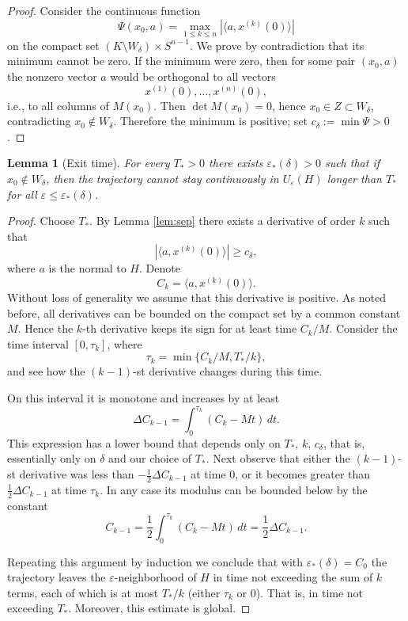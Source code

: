 \documentclass[11pt]{article}
\newcommand{\eps}{\varepsilon}
\newcommand{\dd}{\,d}
\theoremstyle{thmstyleone}
\newtheorem{lemma}[theorem]{Lemma}
\theoremstyle{thmstyletwo}
\theoremstyle{thmstylethree}
\begin{document}
\begin{appendices}
\begin{proof}
Consider the continuous function
\[
    \Psi(x_0,a)=\max_{1\le k\le n}|\langle a,x^{(k)}(0)\rangle|
\]
on the compact set $(K\setminus W_\delta)\times S^{n-1}$. We prove by contradiction that its minimum cannot be zero. If the minimum were zero, then for some pair $(x_0,a)$ the nonzero vector $a$ would be orthogonal to all vectors
\[
    x^{(1)}(0),\dots,x^{(n)}(0),
\]
i.e., to all columns of $M(x_0)$. Then $\det M(x_0)=0$, hence $x_0\in Z\subset W_\delta$, contradicting $x_0\notin W_\delta$. Therefore the minimum is positive; set $c_\delta:=\min\Psi>0$.
\end{proof}

\begin{lemma}[Exit time]
\label{lem:exit}\label{lem:exit_time_2}
For every $T_*>0$ there exists $\eps_*(\delta)>0$ such that if $x_0\notin W_\delta$, then the trajectory cannot stay continuously in $U_\eps(H)$ longer than $T_*$ for all $\eps\le\eps_*(\delta)$.
\end{lemma}

\begin{proof}
Choose $T_*$. By Lemma \ref{lem:sep} there exists a derivative of order $k$ such that
\[
    |\langle a,x^{(k)}(0)\rangle|\ge c_\delta,
\]
where $a$ is the normal to $H$. Denote
\[
    C_k=\langle a,x^{(k)}(0)\rangle.
\]
Without loss of generality we assume that this derivative is positive. As noted before, all derivatives can be bounded on the compact set by a common constant $M$. Hence the $k$-th derivative keeps its sign for at least time $C_k/M$. Consider the time interval $[0,\tau_k]$, where
\[
    \tau_k=\min\{C_k/M,T_*/k\},
\]
and see how the $(k-1)$-st derivative changes during this time.

On this interval it is monotone and increases by at least
\[
    \Delta C_{k-1}=\int_0^{\tau_k}(C_k-Mt)\dd t.
\]
This expression has a lower bound that depends only on $T_*$, $k$, $c_\delta$, that is, essentially only on $\delta$ and our choice of $T_*$. Next observe that either the $(k-1)$-st derivative was less than $-\frac12\Delta C_{k-1}$ at time $0$, or it becomes greater than $\frac12\Delta C_{k-1}$ at time $\tau_k$. In any case its modulus can be bounded below by the constant
\[
    C_{k-1}=\frac12\int_0^{\tau_k}(C_k-Mt)\dd t=\frac12\Delta C_{k-1}.
\]

Repeating this argument by induction we conclude that with $\eps_*(\delta)=C_0$ the trajectory leaves the $\eps$-neighborhood of $H$ in time not exceeding the sum of $k$ terms, each of which is at most $T_*/k$ (either $\tau_k$ or $0$). That is, in time not exceeding $T_*$. Moreover, this estimate is global.
\end{proof}


\end{appendices}
\end{document}
